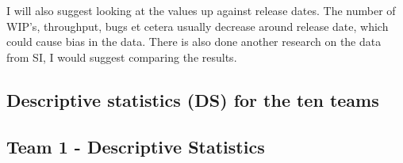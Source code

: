 \documentclass[UKenglish]{ifimaster}  %
\begin{document}
I will also suggest looking at the values up against release dates. The number of WIP's, throughput, bugs et cetera usually decrease around release date, which could cause bias in the data. There is also done another research on the data from SI, I would suggest comparing the results.

\begin{appendices}
\chapter{Descriptive statistics (DS) for the ten teams}
\label{app:DS}
 
\section{Team 1 - Descriptive Statistics}
\begin{table}[!htbp]
\begin{adjustwidth}{-1.5cm}{}
 \begin{subfigure}[b]{0.7\textwidth}
\end{subfigure}
\end{adjustwidth}
\end{table}
\end{appendices}
\end{document}
